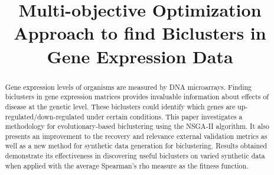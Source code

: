 \documentclass[conference]{IEEEtran}
\begin{document}
\title{Multi-objective Optimization Approach to find Biclusters in Gene Expression Data}

\author{
\and
{}
\and
{}
}



        \maketitle

   \begin{abstract}
      
     Gene expression levels of organisms are measured by DNA microarrays.
     Finding biclusters in gene expression matrices provides  invaluable information about effects of disease at the genetic level.
      These biclusters could identify which genes are up-regulated/down-regulated under certain conditions. This paper investigates a methodology for evolutionary-based biclustering using the NSGA-II algorithm. It also presents an improvement to the recovery and relevance external validation metrics as well as a new method for synthetic data generation for biclustering. Results obtained demonstrate its effectiveness in discovering useful biclusters on varied synthetic data when applied with the average Spearman's rho measure as the fitness function.
  \end{abstract}
\end{document}
